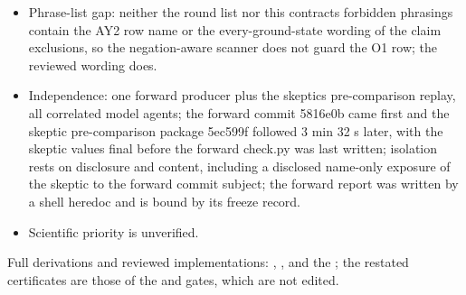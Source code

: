 \begin{gatequote}
\begin{itemize}
W3 (equal to skeptic D2) the inherited parameter control asks for d\_X, N\_0
and weights, and BC1 derives no decay estimate (N\_min plays the role of
N\_0); W4 item 4 needs two open rows where the parameter list has one entry;
W5 (equal to skeptic R3) the template leaves the finite-box state implicit
(the untruncated F2 ground vector at fixed N); D1 no frame for limited
outcomes (moot at this verdict); D3 the inherited clock control is loosely
fitted to a statement loop (executed in full).
\item Phrase-list gap: neither the round list nor this
contract\textquotesingle{}s forbidden phrasings contain the AY2 row name or
the every-ground-state wording of the claim exclusions, so the negation-aware
scanner does not guard the O1 row; the reviewed wording does.
\item Independence: one forward producer plus the skeptic\textquotesingle{}s
pre-comparison replay, all correlated model agents; the forward commit 5816e0b
came first and the skeptic pre-comparison package 5ec599f followed 3 min 32 s
later, with the skeptic values final before the forward check.py was last
written; isolation rests on disclosure and content, including a disclosed
name-only exposure of the skeptic to the forward commit subject; the forward
report was written by a shell heredoc and is bound by its freeze record.
\item Scientific priority is unverified.
\end{itemize}
\end{gatequote}
Full derivations and reviewed implementations:
,
,
 and the
; the restated
certificates are those of the
 and
 gates, which are not
edited.
